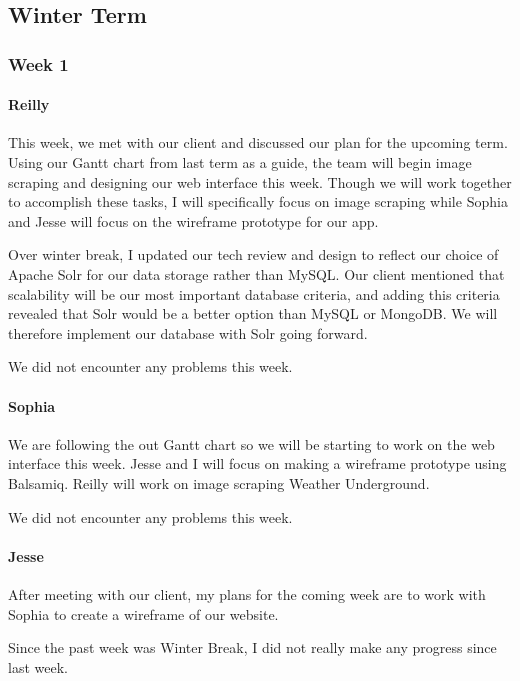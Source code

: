 \documentclass[onecolumn, draftclsnofoot,10pt, compsoc]{IEEEtran}
\begin{document}
\begin{flushleft}
\subsection{Winter Term}
\subsubsection{Week 1}
\paragraph{Reilly}
 
This week, we met with our client and discussed our plan for the upcoming term. Using our Gantt chart from last term as a guide, the team will begin image scraping and designing our web interface this week. Though we will work together to accomplish these tasks, I will specifically focus on image scraping while Sophia and Jesse will focus on the wireframe prototype for our app.
 
 
Over winter break, I updated our tech review and design to reflect our choice of Apache Solr for our data storage rather than MySQL. Our client mentioned that scalability will be our most important database criteria, and adding this criteria revealed that Solr would be a better option than MySQL or MongoDB. We will therefore implement our database with Solr going forward.
 
 
We did not encounter any problems this week.
 
\paragraph{Sophia}
 
We are following the out Gantt chart so we will be starting to work on the web interface this week. Jesse and I will focus on making a wireframe prototype using Balsamiq. Reilly will work on image scraping Weather Underground.
 
 
We did not encounter any problems this week.
 
\paragraph{Jesse}
 
After meeting with our client, my plans for the coming week are to work with Sophia to create a wireframe of our website.
 
 
Since the past week was Winter Break, I did not really make any progress since last week.
 

\end{flushleft}
\end{document}
